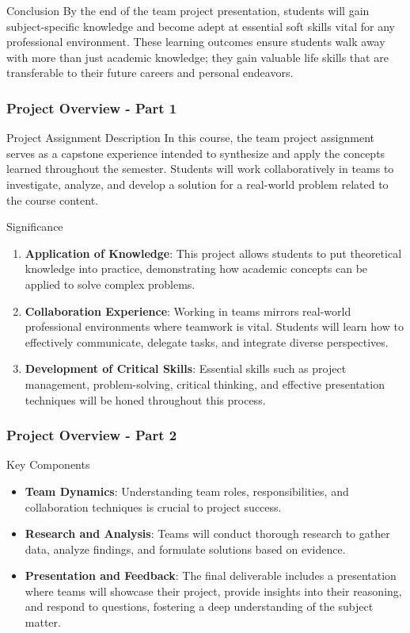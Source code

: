 \documentclass[aspectratio=169]{beamer}
\begin{document}
\begin{frame}[fragile]{Conclusion}
    By the end of the team project presentation, students will gain subject-specific knowledge and become adept at essential soft skills vital for any professional environment. These learning outcomes ensure students walk away with more than just academic knowledge; they gain valuable life skills that are transferable to their future careers and personal endeavors.
\end{frame}

\begin{frame}[fragile]
  \frametitle{Project Overview - Part 1}
  \begin{block}{Project Assignment Description}
    In this course, the team project assignment serves as a capstone experience intended to synthesize and apply the concepts learned throughout the semester. Students will work collaboratively in teams to investigate, analyze, and develop a solution for a real-world problem related to the course content.
  \end{block}
  
  \begin{block}{Significance}
    \begin{enumerate}
      \item \textbf{Application of Knowledge}: This project allows students to put theoretical knowledge into practice, demonstrating how academic concepts can be applied to solve complex problems.
      \item \textbf{Collaboration Experience}: Working in teams mirrors real-world professional environments where teamwork is vital. Students will learn how to effectively communicate, delegate tasks, and integrate diverse perspectives.
      \item \textbf{Development of Critical Skills}: Essential skills such as project management, problem-solving, critical thinking, and effective presentation techniques will be honed throughout this process.
    \end{enumerate}
  \end{block}
\end{frame}

\begin{frame}[fragile]
  \frametitle{Project Overview - Part 2}
  \begin{block}{Key Components}
    \begin{itemize}
      \item \textbf{Team Dynamics}: Understanding team roles, responsibilities, and collaboration techniques is crucial to project success.
      \item \textbf{Research and Analysis}: Teams will conduct thorough research to gather data, analyze findings, and formulate solutions based on evidence.
      \item \textbf{Presentation and Feedback}: The final deliverable includes a presentation where teams will showcase their project, provide insights into their reasoning, and respond to questions, fostering a deep understanding of the subject matter.
    \end{itemize}
  \end{block}
\end{frame}
\end{document}
